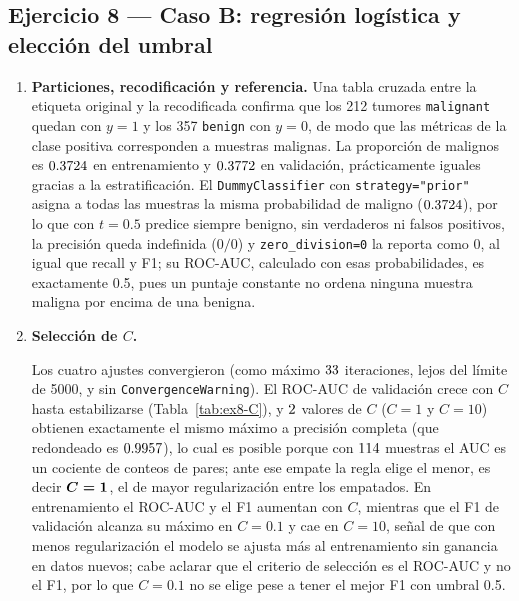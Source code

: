 \subsection{Ejercicio 8 --- Caso B: regresión logística y elección del umbral}

\begin{enumerate}

\item \textbf{Particiones, recodificación y referencia.}
Una tabla cruzada entre la etiqueta original y la recodificada confirma que
los 212 tumores \texttt{malignant} quedan con $y=1$ y los 357
\texttt{benign} con $y=0$, de modo que las métricas de la clase positiva
corresponden a muestras malignas. La proporción de malignos es
$0.3724$ en entrenamiento y $0.3772$ en validación, prácticamente
iguales gracias a la estratificación. El \texttt{DummyClassifier} con
\texttt{strategy="prior"} asigna a todas las muestras la misma probabilidad
de maligno ($0.3724$), por lo que con $t=0.5$ predice siempre benigno,
sin verdaderos ni falsos positivos, la precisión queda indefinida ($0/0$) y
\texttt{zero\_division=0} la reporta como 0, al igual que recall y F1; su
ROC-AUC, calculado con esas probabilidades, es exactamente 0.5, pues un
puntaje constante no ordena ninguna muestra maligna por encima de una
benigna.

\item \textbf{Selección de $C$.}

\begin{table}[H]
\centering
\resizebox{\textwidth}{!}{}
\caption{Regresión logística según $C$: ROC-AUC y F1 ($t=0.5$) en entrenamiento y validación, y convergencia.}
\label{tab:ex8-C}
\end{table}

Los cuatro ajustes convergieron (como máximo $33$ iteraciones,
lejos del límite de 5000, y sin \texttt{ConvergenceWarning}). El ROC-AUC de
validación crece con $C$ hasta estabilizarse (Tabla~\ref{tab:ex8-C}), y
$2$ valores de $C$ ($C=1$ y $C=10$) obtienen exactamente el
mismo máximo a precisión completa (que redondeado es $0.9957$), lo cual es
posible porque con $114$ muestras el AUC es un cociente de conteos de
pares; ante ese empate la regla elige el menor, es decir
$\boldsymbol{C=1}$, el de mayor regularización entre los empatados.
En entrenamiento el ROC-AUC y el F1 aumentan con $C$, mientras que el F1 de
validación alcanza su máximo en $C=0.1$ y cae en $C=10$, señal de que con
menos regularización el modelo se ajusta más al entrenamiento sin ganancia
en datos nuevos; cabe aclarar que el criterio de selección es el ROC-AUC y no
el F1, por lo que $C=0.1$ no se elige pese a tener el mejor F1 con umbral
0.5.


\end{enumerate}
